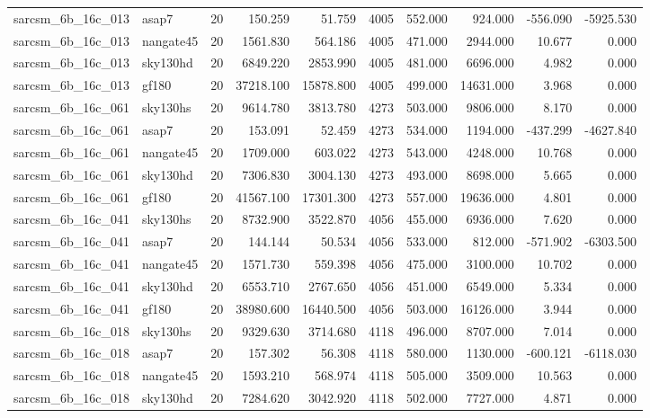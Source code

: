 \begin{tabular}{llrrrrrrrr}
sarcsm\_6b\_16c\_013 & asap7 & 20 & 150.259 & 51.759 & 4005 & 552.000 & 924.000 & -556.090 & -5925.530 \\
sarcsm\_6b\_16c\_013 & nangate45 & 20 & 1561.830 & 564.186 & 4005 & 471.000 & 2944.000 & 10.677 & 0.000 \\
sarcsm\_6b\_16c\_013 & sky130hd & 20 & 6849.220 & 2853.990 & 4005 & 481.000 & 6696.000 & 4.982 & 0.000 \\
sarcsm\_6b\_16c\_013 & gf180 & 20 & 37218.100 & 15878.800 & 4005 & 499.000 & 14631.000 & 3.968 & 0.000 \\
sarcsm\_6b\_16c\_061 & sky130hs & 20 & 9614.780 & 3813.780 & 4273 & 503.000 & 9806.000 & 8.170 & 0.000 \\
sarcsm\_6b\_16c\_061 & asap7 & 20 & 153.091 & 52.459 & 4273 & 534.000 & 1194.000 & -437.299 & -4627.840 \\
sarcsm\_6b\_16c\_061 & nangate45 & 20 & 1709.000 & 603.022 & 4273 & 543.000 & 4248.000 & 10.768 & 0.000 \\
sarcsm\_6b\_16c\_061 & sky130hd & 20 & 7306.830 & 3004.130 & 4273 & 493.000 & 8698.000 & 5.665 & 0.000 \\
sarcsm\_6b\_16c\_061 & gf180 & 20 & 41567.100 & 17301.300 & 4273 & 557.000 & 19636.000 & 4.801 & 0.000 \\
sarcsm\_6b\_16c\_041 & sky130hs & 20 & 8732.900 & 3522.870 & 4056 & 455.000 & 6936.000 & 7.620 & 0.000 \\
sarcsm\_6b\_16c\_041 & asap7 & 20 & 144.144 & 50.534 & 4056 & 533.000 & 812.000 & -571.902 & -6303.500 \\
sarcsm\_6b\_16c\_041 & nangate45 & 20 & 1571.730 & 559.398 & 4056 & 475.000 & 3100.000 & 10.702 & 0.000 \\
sarcsm\_6b\_16c\_041 & sky130hd & 20 & 6553.710 & 2767.650 & 4056 & 451.000 & 6549.000 & 5.334 & 0.000 \\
sarcsm\_6b\_16c\_041 & gf180 & 20 & 38980.600 & 16440.500 & 4056 & 503.000 & 16126.000 & 3.944 & 0.000 \\
sarcsm\_6b\_16c\_018 & sky130hs & 20 & 9329.630 & 3714.680 & 4118 & 496.000 & 8707.000 & 7.014 & 0.000 \\
sarcsm\_6b\_16c\_018 & asap7 & 20 & 157.302 & 56.308 & 4118 & 580.000 & 1130.000 & -600.121 & -6118.030 \\
sarcsm\_6b\_16c\_018 & nangate45 & 20 & 1593.210 & 568.974 & 4118 & 505.000 & 3509.000 & 10.563 & 0.000 \\
sarcsm\_6b\_16c\_018 & sky130hd & 20 & 7284.620 & 3042.920 & 4118 & 502.000 & 7727.000 & 4.871 & 0.000 \\

\end{tabular}
